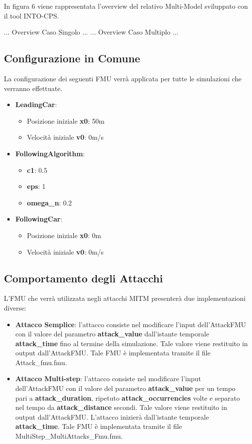 In figura 6 viene rappresentata l'overview del relativo Multi-Model sviluppato con il tool INTO-CPS. 

... Overview Caso Singolo ...
... Overview Caso Multiplo ...

\subsection{Configurazione in Comune}
La configurazione dei seguenti FMU verrà applicata per tutte le simulazioni che verranno effettuate.
\begin{itemize}
	\item \textbf{LeadingCar}:
	\begin{itemize}
		\item Posizione iniziale \textbf{x0}: 50m
		\item Velocità iniziale \textbf{v0}: 0m/s
	\end{itemize}
	
	\item \textbf{FollowingAlgorithm}:
	\begin{itemize}
		\item \textbf{c1}: 0.5
		\item \textbf{eps}: 1
		\item \textbf{omega\_n}: 0.2
	\end{itemize}
	
	
	\item \textbf{FollowingCar}:
	\begin{itemize}
		\item Posizione iniziale \textbf{x0}: 0m
		\item Velocità iniziale \textbf{v0}: 0m/s
	\end{itemize}
\end{itemize}

\subsection{Comportamento degli Attacchi}
L'FMU che verrà utilizzata negli attacchi MITM presenterà due implementazioni diverse:
\begin{itemize}
\item \textbf{Attacco Semplice}: l'attacco consiste nel modificare l'input dell'AttackFMU con il valore del parametro \textbf{attack\_value} dall'istante temporale \textbf{attack\_time} fino al termine della simulazione. Tale valore viene restituito in output dall'AttackFMU. Tale FMU è implementata tramite il file Attack\_fmu.fmu.
\item \textbf{Attacco Multi-step}: l'attacco consiste nel modificare l'input dell'AttackFMU con il valore del parametro \textbf{attack\_value} per un tempo pari a \textbf{attack\_duration}, ripetuto \textbf{attack\_occurrencies} volte e separato nel tempo da \textbf{attack\_distance} secondi. Tale valore viene restituito in output dall'AttackFMU. L'attacco inizierà dall'istante temporale \textbf{attack\_time}. Tale FMU è implementata tramite il file MultiStep\_MultiAttacks\_Fmu.fmu.

\end{itemize}